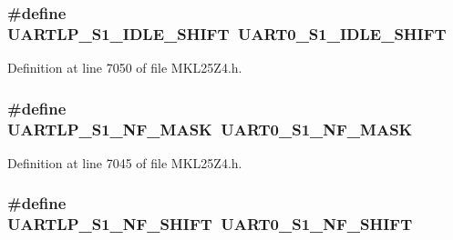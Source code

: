 \subsubsection[{\texorpdfstring{U\+A\+R\+T\+L\+P\+\_\+\+S1\+\_\+\+I\+D\+L\+E\+\_\+\+S\+H\+I\+FT}{UARTLP_S1_IDLE_SHIFT}}]{\setlength{\rightskip}{0pt plus 5cm}\#define U\+A\+R\+T\+L\+P\+\_\+\+S1\+\_\+\+I\+D\+L\+E\+\_\+\+S\+H\+I\+FT~{\bf U\+A\+R\+T0\+\_\+\+S1\+\_\+\+I\+D\+L\+E\+\_\+\+S\+H\+I\+FT}}\hypertarget{group___backward___compatibility___symbols_gae842244614239cddb394428e2e1f8bc0}{}\label{group___backward___compatibility___symbols_gae842244614239cddb394428e2e1f8bc0}


Definition at line 7050 of file M\+K\+L25\+Z4.\+h.

\subsubsection[{\texorpdfstring{U\+A\+R\+T\+L\+P\+\_\+\+S1\+\_\+\+N\+F\+\_\+\+M\+A\+SK}{UARTLP_S1_NF_MASK}}]{\setlength{\rightskip}{0pt plus 5cm}\#define U\+A\+R\+T\+L\+P\+\_\+\+S1\+\_\+\+N\+F\+\_\+\+M\+A\+SK~{\bf U\+A\+R\+T0\+\_\+\+S1\+\_\+\+N\+F\+\_\+\+M\+A\+SK}}\hypertarget{group___backward___compatibility___symbols_gadb12f094eea34062c806a23793565545}{}\label{group___backward___compatibility___symbols_gadb12f094eea34062c806a23793565545}


Definition at line 7045 of file M\+K\+L25\+Z4.\+h.

\subsubsection[{\texorpdfstring{U\+A\+R\+T\+L\+P\+\_\+\+S1\+\_\+\+N\+F\+\_\+\+S\+H\+I\+FT}{UARTLP_S1_NF_SHIFT}}]{\setlength{\rightskip}{0pt plus 5cm}\#define U\+A\+R\+T\+L\+P\+\_\+\+S1\+\_\+\+N\+F\+\_\+\+S\+H\+I\+FT~{\bf U\+A\+R\+T0\+\_\+\+S1\+\_\+\+N\+F\+\_\+\+S\+H\+I\+FT}}\hypertarget{group___backward___compatibility___symbols_ga92f53755733ec53ddfe0179c6d1174f4}{}\label{group___backward___compatibility___symbols_ga92f53755733ec53ddfe0179c6d1174f4}


